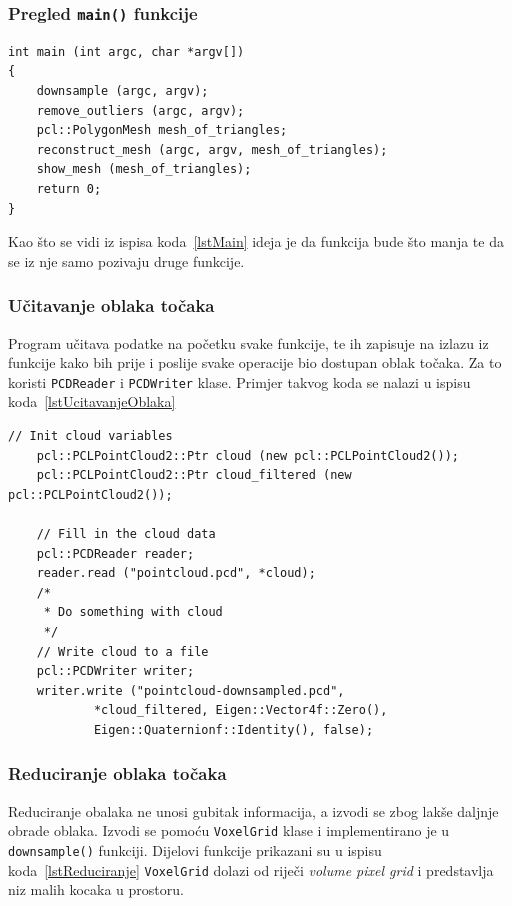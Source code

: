 \subsubsection{Pregled \texttt{main()} funkcije} %
\label{ssub:Pregled main funkcije}
\begin{lstlisting}[label=lstMain,caption={Izvorni kod
\texttt{main() funkcije} }]
int main (int argc, char *argv[])
{
    downsample (argc, argv);
    remove_outliers (argc, argv);
    pcl::PolygonMesh mesh_of_triangles;
    reconstruct_mesh (argc, argv, mesh_of_triangles);
    show_mesh (mesh_of_triangles);
    return 0;
}
\end{lstlisting}
Kao što se vidi iz ispisa koda~\ref{lstMain} ideja je da funkcija bude
što manja te da se iz nje samo pozivaju druge funkcije. 


\newpage
\subsubsection{Učitavanje oblaka točaka} %
\label{ssub:Učitavanje oblaka točaka}
Program učitava podatke na početku svake funkcije, te ih zapisuje na
izlazu iz funkcije kako bih prije i poslije svake operacije bio dostupan
oblak točaka. Za to koristi \texttt{PCDReader} i \texttt{PCDWriter} klase.
Primjer takvog koda se nalazi u ispisu koda~\ref{lstUcitavanjeOblaka}

\begin{lstlisting}[label=lstUcitavanjeOblaka, caption={Primjer izvornog
koda za učitavanje oblaka točaka}]
    // Init cloud variables 
    pcl::PCLPointCloud2::Ptr cloud (new pcl::PCLPointCloud2());
    pcl::PCLPointCloud2::Ptr cloud_filtered (new pcl::PCLPointCloud2());

    // Fill in the cloud data
    pcl::PCDReader reader;
    reader.read ("pointcloud.pcd", *cloud);
    /* 
     * Do something with cloud
     */
    // Write cloud to a file
    pcl::PCDWriter writer;
    writer.write ("pointcloud-downsampled.pcd",
            *cloud_filtered, Eigen::Vector4f::Zero(),
            Eigen::Quaternionf::Identity(), false);
\end{lstlisting}


\subsubsection{Reduciranje oblaka točaka} %
\label{ssub:Reduciranje oblaka točaka}
Reduciranje obalaka ne unosi gubitak informacija, a izvodi se zbog lakše
daljnje obrade oblaka. Izvodi se pomoću \texttt{VoxelGrid} klase i
implementirano je u \texttt{downsample()} funkciji. Dijelovi funkcije
prikazani su u ispisu koda~\ref{lstReduciranje}
\texttt{VoxelGrid} dolazi od riječi \textit{volume pixel grid} i
predstavlja niz malih kocaka u prostoru.

